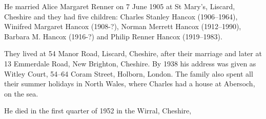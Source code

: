 He married Alice Margaret Renner on 7 June 1905 at St Mary's, Liscard, Cheshire and they had five children:  Charles Stanley Hancox (1906--1964), Winifred Margaret Hancox (1908-?), Norman Merrett Hancox (1912--1990), Barbara M. Hancox (1916-?) and Philip Renner Hancox (1919--1983).

They lived at 54 Manor Road, Liscard, Cheshire, after their marriage\cite{CharlesEdwardHancoxHouse} and later at 13 Emmerdale Road, New Brighton, Cheshire.  By 1938 his address was given as Witley Court, 54--64 Coram Street, Holborn, London.\cite{CharlesEdwardHancoxLondonhouse}  The family also spent all their summer holidays in North Wales, where Charles had a house at Abersoch, on the sea.

He died in the first quarter of 1952 in the Wirral, Cheshire,
